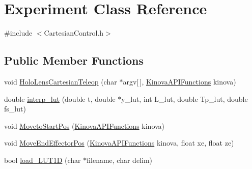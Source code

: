 \hypertarget{classExperiment}{}\section{Experiment Class Reference}
\label{classExperiment}


{\ttfamily \#include $<$Cartesian\+Control.\+h$>$}

\subsection*{Public Member Functions}
\begin{DoxyCompactItemize}
\item 
void \hyperlink{classExperiment_a6b40f95a20017941c6cb3e0d120bc998}{Holo\+Lens\+Cartesian\+Teleop} (char $\ast$argv\mbox{[}$\,$\mbox{]}, \hyperlink{classKinovaAPIFunctions}{Kinova\+A\+P\+I\+Functions} kinova)
\item 
double \hyperlink{classExperiment_a33a2f22c61afa5e85cb5a9004d62b4b3}{interp\+\_\+lut} (double t, double $\ast$y\+\_\+lut, int L\+\_\+lut, double Tp\+\_\+lut, double fs\+\_\+lut)
\item 
void \hyperlink{classExperiment_afe22dc21cf9b4a7b07ebb2f9b7eeafce}{Moveto\+Start\+Pos} (\hyperlink{classKinovaAPIFunctions}{Kinova\+A\+P\+I\+Functions} kinova)
\item 
void \hyperlink{classExperiment_a964fe7c5d4f78565bd98f3f1c860a01c}{Move\+End\+Effector\+Pos} (\hyperlink{classKinovaAPIFunctions}{Kinova\+A\+P\+I\+Functions} kinova, float xe, float ze)
\item 
bool \hyperlink{classExperiment_aedc226b0d88508dc7576686f808de0ea}{load\+\_\+\+L\+U\+T1D} (char $\ast$filename, char delim)
\end{DoxyCompactItemize}
